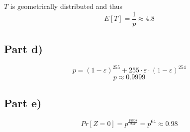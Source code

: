 \documentclass[10pt,a4paper]{article}
\begin{document}
$T$ is geometrically distributed and thus
\begin{equation*}
  E[T] = \frac{1}{p} \approx 4.8
\end{equation*}

\subsection*{Part d)}

\begin{equation*}
  p = (1 - \varepsilon)^{255} + 255 \cdot \varepsilon \cdot (1 - \varepsilon)^{254}
\end{equation*}
\begin{equation*}
  p \approx 0.9999
\end{equation*}

\subsection*{Part e)}

\begin{equation*}
  Pr[Z = 0] = p^{\frac{15808}{247}} = p^{64} \approx 0.98
\end{equation*}
\end{document}
